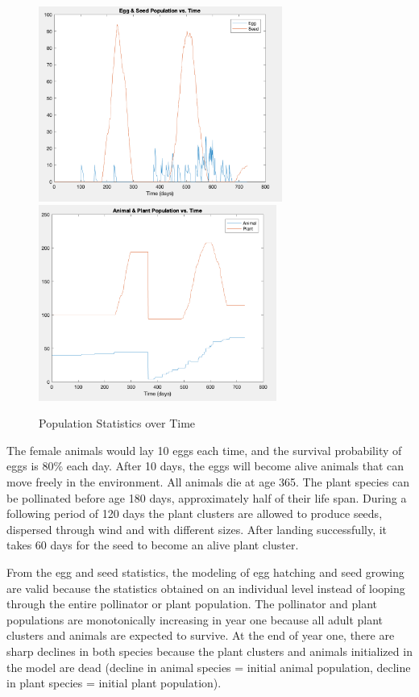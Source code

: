 \documentclass[3p,,preprint,12pt]{elsarticle}
\begin{document}
    \begin{figure}[!htb]
    \begin{center}
    \includegraphics[width=80mm]{figures/validation_1.png} 
    \includegraphics[width=78mm]{figures/validation_2.png}
    \caption{Population Statistics over Time}
    \end{center}
    \end{figure}

The female animals would lay 10 eggs each time, and the survival probability of eggs is $80\%$ each day. After 10 days, the eggs will become alive animals that can move freely in the environment. All animals die at age 365. The plant species can be pollinated before age 180 days, approximately half of their life span. During a following period of 120 days the plant clusters are allowed to produce seeds, dispersed through wind and with different sizes. After landing successfully, it takes 60 days for the seed to become an alive plant cluster.

From the egg and seed statistics, the modeling of egg hatching and seed growing are valid because the statistics obtained on an individual level instead of looping through the entire pollinator or plant population. The pollinator and plant populations are monotonically increasing in year one because all adult plant clusters and animals are expected to survive. At the end of year one, there are sharp declines in both species because the plant clusters and animals initialized in the model are dead (decline in animal species = initial animal population, decline in plant species = initial plant population).
\pagebreak
\end{document}
